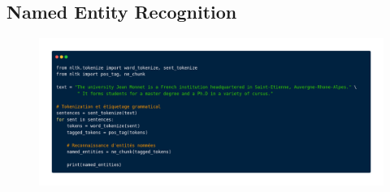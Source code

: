 \subsection{Named Entity Recognition}
\begin{frame}{\subsecname}

\begin{figure}[ht]

\includegraphics[scale=.22]{img/ner_nltk.png}
\end{figure}

\end{frame}

